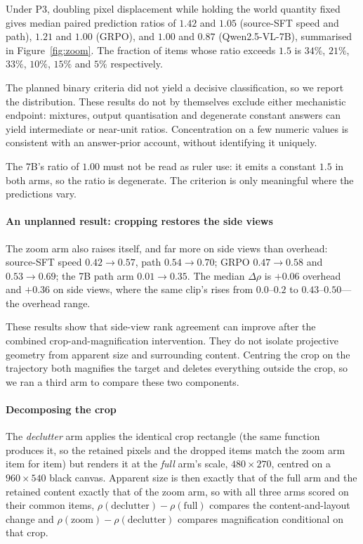 Under P3, doubling pixel displacement while holding the world quantity fixed
gives median paired prediction ratios of $1.42$ and $1.05$ (source-SFT speed and path),
$1.21$ and $1.00$ (GRPO), and $1.00$ and $0.87$ (Qwen2.5-VL-7B), summarised in
Figure~\ref{fig:zoom}. The fraction of items whose ratio exceeds $1.5$ is
$34\%$, $21\%$, $33\%$, $10\%$, $15\%$ and $5\%$ respectively.

The planned binary criteria did not yield a decisive classification, so we
report the distribution. These results do not by themselves exclude either
mechanistic endpoint: mixtures, output quantisation and degenerate constant
answers can yield intermediate or near-unit ratios. Concentration on a few
numeric values is consistent with an answer-prior account, without identifying
it uniquely.

The 7B's ratio of $1.00$ must not be read as ruler use: it emits a constant
$1.5$ in both arms, so the ratio is degenerate. The criterion is only meaningful
where the predictions vary.

\paragraph{An unplanned result: cropping restores the side views}
The zoom arm also raises \rhosp{} itself, and far more on side views than
overhead: source-SFT speed $0.42 \to 0.57$, path $0.54 \to 0.70$; GRPO
$0.47 \to 0.58$ and $0.53 \to 0.69$; the 7B path arm $0.01 \to 0.35$. The median
$\Delta\rho$ is $+0.06$ overhead and $+0.36$ on side views, where the same
clip's \rhosp{} rises from $0.0$--$0.2$ to $0.43$--$0.50$---the overhead range.

These results show that side-view rank agreement can improve after the
combined crop-and-magnification intervention. They do not isolate projective
geometry from apparent size and surrounding content. Centring the crop on
the trajectory both magnifies the target and deletes everything outside the
crop, so we ran a third arm to compare these two components.

\paragraph{Decomposing the crop}
The \emph{declutter} arm applies the identical crop rectangle (the same function
produces it, so the retained pixels and the dropped items match the zoom arm
item for item) but renders it at the \emph{full} arm's scale, $480 \times 270$,
centred on a $960 \times 540$ black canvas. Apparent size is then exactly that
of the full arm and the retained content exactly that of the zoom arm, so with
all three arms scored on their common items,
$\rho(\text{declutter}) - \rho(\text{full})$ compares the content-and-layout change
and $\rho(\text{zoom}) - \rho(\text{declutter})$ compares magnification conditional on that crop.


